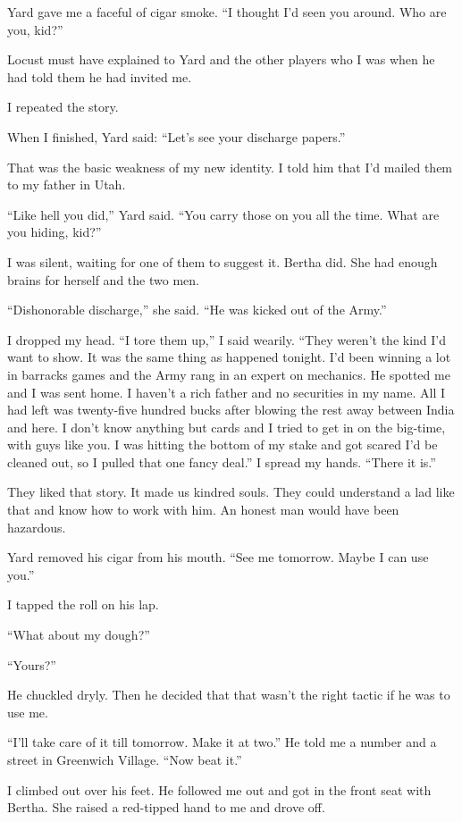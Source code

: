 \documentclass{novel}
\begin{document}
Yard gave me a faceful of cigar smoke. “I thought I’d seen you around. Who are you, kid?”

Locust must have explained to Yard and the other players who I was when he had told them he had invited me.

I repeated the story.

When I finished, Yard said: “Let’s see your discharge papers.”

That was the basic weakness of my new identity. I told him that I’d mailed them to my father in Utah.

“Like hell you did,” Yard said. “You carry those on you all the time. What are you hiding, kid?”

\scenestars

I was silent, waiting for one of them to suggest it. Bertha did. She had enough brains for herself and the two men.

“Dishonorable discharge,” she said. “He was kicked out of the Army.”

I dropped my head. “I tore them up,” I said wearily. “They weren’t the kind I’d want to show. It was the same thing as happened tonight. I’d been winning a lot in barracks games and the Army rang in an expert on mechanics. He spotted me and I was sent home. I haven’t a rich father and no securities in my name. All I had left was twenty-five hundred bucks after blowing the rest away between India and here. I don’t know anything but cards and I tried to get in on the big-time, with guys like you. I was hitting the bottom of my stake and got scared I’d be cleaned out, so I pulled that one fancy deal.” I spread my hands. “There it is.”

They liked that story. It made us kindred souls. They could understand a lad like that and know how to work with him. An honest man would have been hazardous.

Yard removed his cigar from his mouth. “See me tomorrow. Maybe I can use you.”

I tapped the roll on his lap.

“What about my dough?”

“Yours?”

He chuckled dryly. Then he decided that that wasn’t the right tactic if he was to use me.

“I’ll take care of it till tomorrow. Make it at two.” He told me a number and a street in Greenwich Village. “Now beat it.”

I climbed out over his feet. He followed me out and got in the front seat with Bertha. She raised a red-tipped hand to me and drove off.
\end{document}
